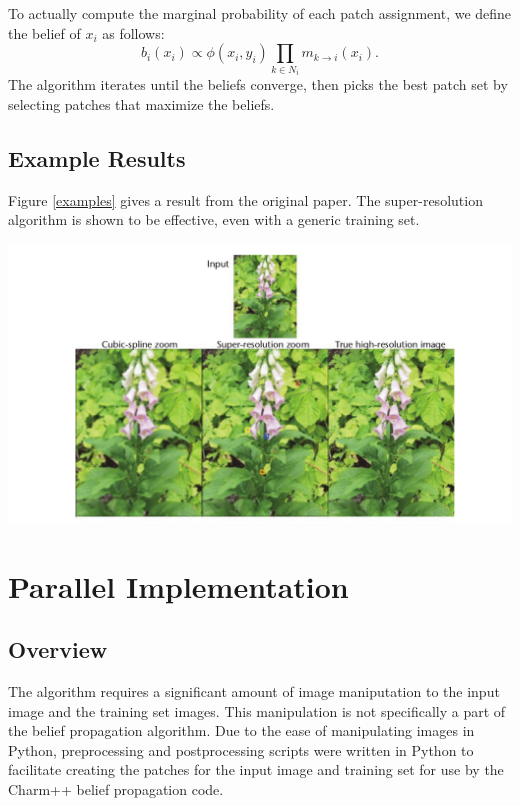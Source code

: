 \documentclass[a4paper]{article}
\begin{document}
To actually compute the marginal probability of each patch assignment, we define the belief of $x_i$ as follows:
$$b_i(x_i) \propto \phi(x_i, y_i) \prod_{k \in N_i} m_{k \to i}(x_i).$$
The algorithm iterates until the beliefs converge, then picks the best patch set by selecting patches that maximize the beliefs.
\subsection{Example Results}
Figure \ref{examples} gives a result from the original paper. The super-resolution algorithm is shown to be effective, even with a generic training set.
\begin{center}
\includegraphics[scale=.4]{figs/flower}
\label{examples}
\end{center}

\section{Parallel Implementation}
\subsection{Overview}
The algorithm requires a significant amount of image maniputation to the input image and the training set images.  This manipulation is not specifically a part of the belief propagation algorithm.  Due to the ease of manipulating images in Python, preprocessing and postprocessing scripts were written in Python to facilitate creating the patches for the input image and training set for use by the Charm++ belief propagation code.
\end{document}
